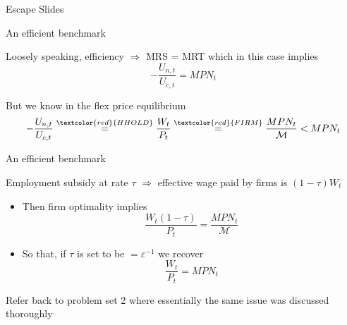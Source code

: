 

\begin{frame}

\begin{center}
{\LARGE Escape Slides}
\end{center}

\end{frame}


	
\begin{frame}[label=efficiency_escape]{An efficient benchmark}

Loosely speaking, efficiency $\Rightarrow$ MRS = MRT which in this case implies
\[
-\frac{U_{n,t}}{U_{c,t}} = MPN_{t}
\]

But we know in the flex price equilibrium
\[
-\frac{U_{n,t}}{U_{c,t}} \stackrel{\textcolor{red}{HHOLD}}= \frac{W_{t}}{P_{t}}\stackrel{\textcolor{red}{FIRM}}= \frac{MPN_{t}}{\mathcal{M}} < MPN_{t}
\]

\end{frame}


	
\begin{frame}{An efficient benchmark}

Employment subsidy at rate $\tau$ $\Rightarrow$ effective wage paid by firms is $(1-\tau)W_{t}$

\vspace{2mm}
\begin{itemize}
\item	Then firm optimality implies
\[
\frac{W_{t}(1-\tau)}{P_{t}}= \frac{MPN_{t}}{\mathcal{M}}
\]
\item	So that, if $\tau$ is set to be $=\varepsilon^{-1}$ we recover
\[
\frac{W_{t}}{P_{t}}= MPN_{t}
\]
\end{itemize}

Refer back to problem set 2 where essentially the same issue was discussed thoroughly

\hyperlink{efficiency}{}

\end{frame}